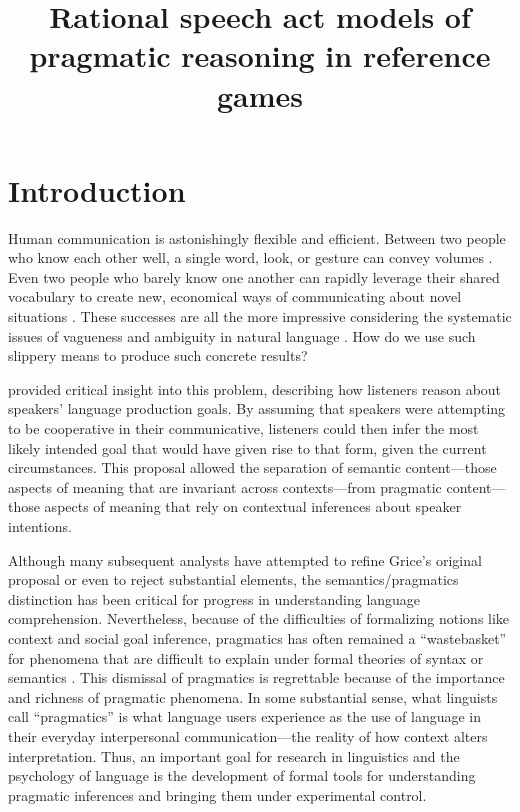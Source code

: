 \documentclass[man,noapacite]{apa2}
\title{\vspace{-2ex} Rational speech act models of pragmatic reasoning in reference games}
\begin{document}
\maketitle

\section{Introduction}

Human communication is astonishingly flexible and efficient. Between two people who know each other well, a single word, look, or gesture can convey volumes \cite{sperber1986,clark1996}. Even two people who barely know one another can rapidly leverage their shared vocabulary to create new, economical ways of communicating about novel situations \cite{brennan1996,clark1991}. These successes are all the more impressive considering the systematic issues of vagueness and ambiguity in natural language \cite{keefe1997,wasow2005}. How do we use such slippery means to produce such concrete results?

 provided critical insight into this problem, describing how listeners reason about speakers' language production goals. By assuming that speakers were attempting to be cooperative in their communicative, listeners could then infer the most likely intended goal that would have given rise to that form, given the current circumstances. This proposal allowed the separation of semantic content---those aspects of meaning that are invariant across contexts---from pragmatic content---those aspects of meaning that rely on contextual inferences about speaker intentions.

Although many subsequent analysts have attempted to refine Grice's original proposal or even to reject substantial elements, the semantics/pragmatics distinction has been critical for progress in understanding language comprehension. Nevertheless, because of the difficulties of formalizing notions like context and social goal inference, pragmatics has often remained a ``wastebasket'' for phenomena that are difficult to explain under formal theories of syntax or semantics \cite{bar-hillel1971}. This dismissal of pragmatics is regrettable because of the importance and richness of pragmatic phenomena. In some substantial sense, what linguists call ``pragmatics'' is what language users experience as the use of language in their everyday interpersonal communication---the reality of how context alters interpretation. Thus, an important goal for research in linguistics and the psychology of language is the development of formal tools for understanding pragmatic inferences and bringing them under experimental control.
\end{document}
